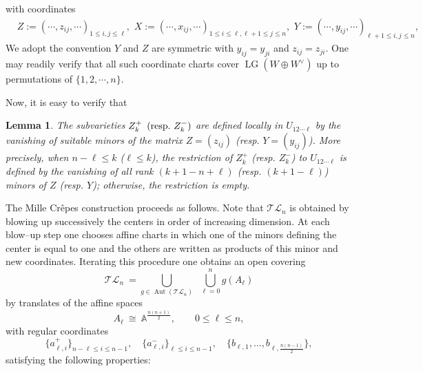 \documentclass[10pt]{amsart}
\newtheorem{lemma}[theorem]{Lemma}
\theoremstyle{definition}
\newcommand{\A}{\mathbb{A}}
\newcommand{\LG}{\operatorname{LG}}
\newcommand{\TL}{\mathcal{TL}}
\theoremstyle{plain} %
\begin{document}
with coordinates
\begin{equation}\label{ulxl}
\begin{split}
&Z:=(\cdots,z_{ij},\cdots)_{1\leq i,j\leq \ell},\,\,X:=(\cdots,x_{ij},\cdots)_{1\leq i\leq \ell,\ell+1\leq j\leq n},\,\,Y:=(\cdots,y_{ij},\cdots)_{\ell+1\leq i,j\leq n},
\end{split}   
\end{equation}
We adopt the convention $Y$ and $Z$ are symmetric with $y_{ij}=y_{ji}$ and $z_{ij}=z_{ji}$. %
One may readily verify that all such coordinate charts cover $\LG(W \oplus W^\vee)$ up to permutations of $\{1,2,\cdots,n\}$. 

Now, it is easy to verify that
\begin{lemma}\label{sepal}
The subvarieties
$Z_k^+\,\,\,
({\rm resp.}\,\, Z_k^-)$
are defined locally in $U_{12\cdots \ell}$ by the vanishing of suitable minors of the matrix $Z=(z_{ij})$ ({\rm resp.}\,\,$Y=(y_{ij})$). More precisely, when $n-\ell\leq k$ ($\ell\leq k$), the restriction of $Z^+_k$ (resp. $Z^-_k$) to $U_{12\cdots \ell}$ is defined by the vanishing of all rank $(k+1-n+\ell)$ (resp. $(k+1-\ell)$) minors of $Z$ (resp. $Y$); otherwise, the restriction is empty.
\end{lemma}



The Mille Cr\^epes construction proceeds as follows. Note that $\TL_n$ is obtained by blowing up successively the centers in order of increasing
dimension. At each blow–up
step one chooses affine charts in which one of the minors defining the center is equal to one and the others are written as products of this
minor and new coordinates. Iterating this procedure one obtains an
open covering
\[
\TL_n \ =\bigcup_{g \in \operatorname{Aut}(\TL_n)} \; \ \bigcup_{\ell=0}^{n} g(A_\ell)
\]
by translates of the affine spaces
\[
A_\ell \ \cong\ \A^{\frac{n(n+1)}{2}},
\qquad 0\le \ell\le n,
\]
with regular coordinates
\[
\bigl\{
a_{\ell,i}^+\bigr\}_{n-\ell\le i\le n-1},
\quad
\bigl\{a_{\ell,i}^-\bigr\}_{\ell\le i\le n-1},
\quad
\bigl\{b_{\ell,1},\dots,b_{\ell,\frac{n(n-1)}{2}}\bigr\},
\]
satisfying the following properties:
\end{document}
